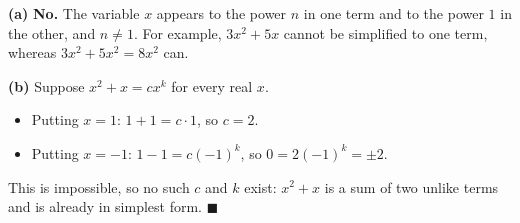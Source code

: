 \textbf{(a)} \textbf{No.} The variable $x$ appears to the power $n$ in one term and to the power $1$ in the other, and $n\ne1$. For example, $3x^2+5x$ cannot be simplified to one term, whereas $3x^2+5x^2=8x^2$ can.

\textbf{(b)} Suppose $x^2+x=cx^k$ for every real $x$.
\begin{itemize}
\item Putting $x=1$: $1+1=c\cdot1$, so $c=2$.
\item Putting $x=-1$: $1-1=c(-1)^k$, so $0=2(-1)^k=\pm2$.
\end{itemize}
This is impossible, so no such $c$ and $k$ exist: $x^2+x$ is a sum of two unlike terms and is already in simplest form. $\blacksquare$
